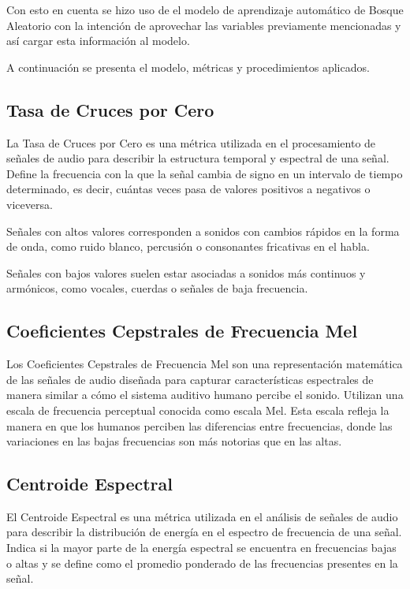 \documentclass{article}
\begin{document}
Con esto en cuenta se hizo uso de el modelo de aprendizaje automático de Bosque Aleatorio con la intención de aprovechar las variables previamente mencionadas y así cargar esta información al modelo.

A continuación se presenta el modelo, métricas y procedimientos aplicados.

\subsection{Tasa de Cruces por Cero}
La Tasa de Cruces por Cero es una métrica utilizada en el procesamiento de señales de audio para describir la estructura temporal y espectral de una señal. Define la frecuencia con la que la señal cambia de signo en un intervalo de tiempo determinado, es decir, cuántas veces pasa de valores positivos a negativos o viceversa.

Señales con altos valores corresponden a sonidos con cambios rápidos en la forma de onda, como ruido blanco, percusión o consonantes fricativas en el habla.

Señales con bajos valores suelen estar asociadas a sonidos más continuos y armónicos, como vocales, cuerdas o señales de baja frecuencia.

\subsection{Coeficientes Cepstrales de Frecuencia Mel}
Los Coeficientes Cepstrales de Frecuencia Mel son una representación matemática de las señales de audio diseñada para capturar características espectrales de manera similar a cómo el sistema auditivo humano percibe el sonido. Utilizan una escala de frecuencia perceptual conocida como escala Mel. Esta escala refleja la manera en que los humanos perciben las diferencias entre frecuencias, donde las variaciones en las bajas frecuencias son más notorias que en las altas.

\subsection{Centroide Espectral}
El Centroide Espectral es una métrica utilizada en el análisis de señales de audio para describir la distribución de energía en el espectro de frecuencia de una señal. Indica si la mayor parte de la energía espectral se encuentra en frecuencias bajas o altas y se define como el promedio ponderado de las frecuencias presentes en la señal.
\end{document}
